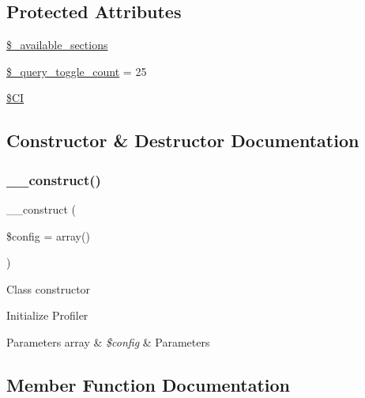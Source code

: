 \subsection*{Protected Attributes}
\begin{DoxyCompactItemize}
\item 
\mbox{\hyperlink{class_c_i___profiler_ae30756727f63d3be7422d378676f667d}{\$\+\_\+available\+\_\+sections}}
\item 
\mbox{\hyperlink{class_c_i___profiler_a950aa6662ddde22ba9c05adffd6a20c9}{\$\+\_\+query\+\_\+toggle\+\_\+count}} = 25
\item 
\mbox{\hyperlink{class_c_i___profiler_ae0314d046ddf7fcfaec03222977427d3}{\$\+CI}}
\end{DoxyCompactItemize}


\subsection{Constructor \& Destructor Documentation}
\mbox{\label{class_c_i___profiler_af7f9493844d2d66e924e3c1df51ce616}} 
\subsubsection{\texorpdfstring{\+\_\+\+\_\+construct()}{\_\_construct()}}
{\footnotesize\ttfamily \+\_\+\+\_\+construct (\begin{DoxyParamCaption}\item[{}]{\$config = {\ttfamily array()} }\end{DoxyParamCaption})}

Class constructor

Initialize Profiler


\begin{DoxyParams}[1]{Parameters}
array & {\em \$config} & Parameters \\
\hline
\end{DoxyParams}


\subsection{Member Function Documentation}
\mbox{\label{class_c_i___profiler_acecf392de9d6129d3843c64fca7a4766}} 
